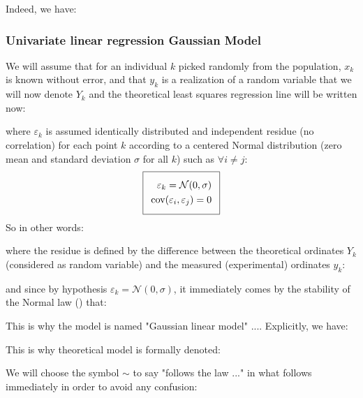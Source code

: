 	Indeed, we have:
	
	
	\pagebreak
	\subsubsection{Univariate linear regression Gaussian Model}
	We will assume that for an individual $k$ picked randomly from the population, $x_k$ is known without error, and that $y_k$ is a realization of a random variable that we will now denote $Y_k$ and the theoretical least squares regression line will be written now:
	
	where $\varepsilon_k$ is assumed identically distributed and independent residue (no correlation) for each point $k$ according to a centered Normal distribution (zero mean and standard deviation $\sigma$ for all $k$) such as $\forall i\neq j$:
\begin{equation}
  \addtolength{\fboxsep}{5pt}
   \boxed{
   \begin{gathered}
		\begin{aligned}
			\varepsilon_k=\mathcal{N}(0,\sigma)\\
			\text{cov}(\varepsilon_i,\varepsilon_j)=0
		\end{aligned}
   \end{gathered}
   }
\end{equation}
	So in other words:
	
	where  the residue is defined by the difference between the theoretical ordinates $Y_k$ (considered as random variable) and the measured (experimental) ordinates $y_k$:
	
	and since by hypothesis $\varepsilon_k=\mathcal{N}(0,\sigma)$, it immediately comes by the stability of the Normal law () that:
	
	This is why the model is named "Gaussian linear model" .... Explicitly, we have:
	
	This is why theoretical model is formally denoted: 
	
	
	We will choose the symbol $\sim$ to say "follows the law ..." in what follows immediately in order to avoid any confusion:
	
